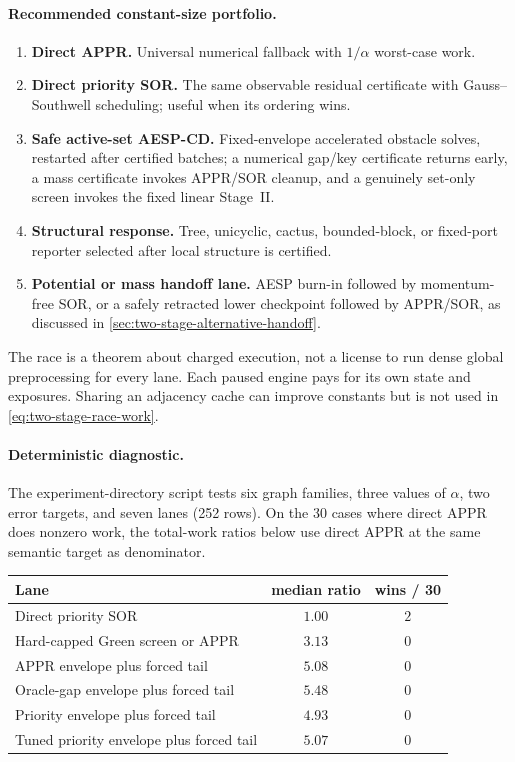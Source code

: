 \paragraph{Recommended constant-size portfolio.}
\begin{enumerate}[leftmargin=2.2em]
\item \textbf{Direct APPR.}  Universal numerical fallback with
  $1/\alpha$ worst-case work.
\item \textbf{Direct priority SOR.}  The same observable residual certificate
  with Gauss--Southwell scheduling; useful when its ordering wins.
\item \textbf{Safe active-set AESP-CD.}  Fixed-envelope accelerated obstacle
  solves, restarted after certified batches; a numerical gap/key certificate
  returns early, a mass certificate invokes APPR/SOR cleanup, and a genuinely
  set-only screen invokes the fixed linear Stage~II.
\item \textbf{Structural response.}  Tree, unicyclic, cactus, bounded-block,
  or fixed-port reporter selected after local structure is certified.
\item \textbf{Potential or mass handoff lane.}  AESP burn-in followed by
  momentum-free SOR, or a safely retracted lower checkpoint followed by
  APPR/SOR, as discussed in
  \cref{sec:two-stage-alternative-handoff}.
\end{enumerate}

The race is a theorem about charged execution, not a license to run dense
global preprocessing for every lane.  Each paused engine pays for its own
state and exposures.  Sharing an adjacency cache can improve constants but is
not used in \cref{eq:two-stage-race-work}.

\paragraph{Deterministic diagnostic.}
The experiment-directory script 
tests six graph families, three values of $\alpha$, two error targets, and
seven lanes (252 rows).  On the 30 cases where direct APPR does nonzero work,
the total-work ratios below use direct APPR at the same semantic target as
denominator.

\begin{center}
\small
\begin{tabular}{@{}lcc@{}}
\toprule
Lane & median ratio & wins / 30 \\
\midrule
Direct priority SOR & $1.00$ & $2$ \\
Hard-capped Green screen or APPR & $3.13$ & $0$ \\
APPR envelope plus forced tail & $5.08$ & $0$ \\
Oracle-gap envelope plus forced tail & $5.48$ & $0$ \\
Priority envelope plus forced tail & $4.93$ & $0$ \\
Tuned priority envelope plus forced tail & $5.07$ & $0$ \\
\bottomrule
\end{tabular}
\end{center}

